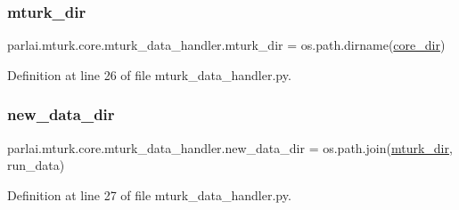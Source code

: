 \subsubsection{\texorpdfstring{mturk\+\_\+dir}{mturk\_dir}}
{\footnotesize\ttfamily parlai.\+mturk.\+core.\+mturk\+\_\+data\+\_\+handler.\+mturk\+\_\+dir = os.\+path.\+dirname(\hyperlink{namespaceparlai_1_1mturk_1_1core_1_1mturk__data__handler_a8006ff4941c7804160312bc362820e97}{core\+\_\+dir})}



Definition at line 26 of file mturk\+\_\+data\+\_\+handler.\+py.

\mbox{\label{namespaceparlai_1_1mturk_1_1core_1_1mturk__data__handler_a49829a6a392d6975e37c5fb375688fdb}} 
\subsubsection{\texorpdfstring{new\+\_\+data\+\_\+dir}{new\_data\_dir}}
{\footnotesize\ttfamily parlai.\+mturk.\+core.\+mturk\+\_\+data\+\_\+handler.\+new\+\_\+data\+\_\+dir = os.\+path.\+join(\hyperlink{namespaceparlai_1_1mturk_1_1core_1_1mturk__data__handler_ac73b24261e8fd0c7cf04c221db3bfd6f}{mturk\+\_\+dir}, \textquotesingle{}run\+\_\+data\textquotesingle{})}



Definition at line 27 of file mturk\+\_\+data\+\_\+handler.\+py.

